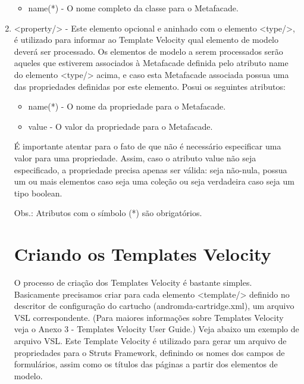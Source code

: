 \begin{enumerate}
\begin{itemize}
  \item name(*) - O nome completo da classe para o Metafacade.
\end{itemize}

\item <property/> - Este elemento opcional e aninhado com o elemento <type/>, é
utilizado para informar ao Template Velocity qual elemento de modelo deverá ser
processado. Os elementos de modelo a serem processados serão aqueles que
estiverem associados à Metafacade definida pelo atributo name do elemento
<type/> acima, e caso esta Metafacade associada possua uma das propriedades
definidas por este elemento. Posui os seguintes atributos:

\begin{itemize}
  \item name(*) - O nome da propriedade para o Metafacade.
  \item value - O valor da propriedade para o Metafacade.
\end{itemize}

É importante atentar para o fato de que não é necessário especificar uma valor
para uma propriedade. Assim, caso o atributo value não seja especificado, a
propriedade precisa apenas ser válida: seja não-nula, possua um ou mais
elementos caso seja uma coleção ou seja verdadeira caso seja um tipo boolean.

Obs.: Atributos com o símbolo (*) são obrigatórios.

\section{Criando os Templates Velocity}
O processo de criação dos Templates Velocity é bastante simples. Basicamente
precisamos criar para cada elemento <template/> definido no descritor de
configuração do cartucho (andromda-cartridge.xml), um arquivo VSL
correspondente. (Para maiores informações sobre Templates Velocity veja o Anexo
3 - Templates Velocity User Guide.) Veja abaixo um exemplo de arquivo VSL. Este
Template Velocity é utilizado para gerar um arquivo de propriedades para o
Struts Framework, definindo os nomes dos campos de formulários, assim como os
títulos das páginas a partir dos elementos de modelo.


\end{enumerate}
